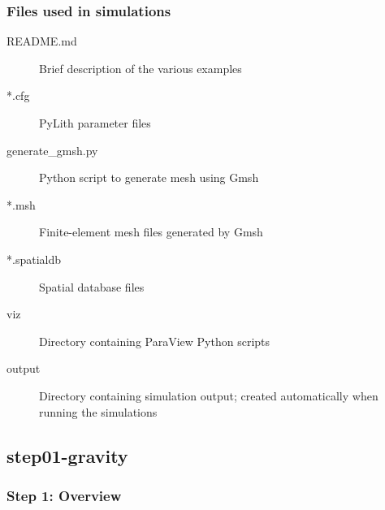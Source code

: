 \documentclass[aspectratio=169]{beamer}
\begin{document}
\begin{frame}
  \frametitle{Files used in simulations}

  \begin{description}
  \item[README.md] Brief description of the various examples
  \item[*.cfg] PyLith parameter files
  \item[generate\_gmsh.py] Python script to generate mesh using Gmsh
  \item[*.msh] Finite-element mesh files generated by Gmsh
  \item[*.spatialdb] Spatial database files
  \item[viz] Directory containing ParaView Python scripts
  \item[output] Directory containing simulation output; created automatically when running the simulations
  \end{description}

\end{frame}


\subsection{step01-gravity}

\begin{frame}
  \frametitle{Step 1: Overview}

      
\end{frame}
\end{document}

